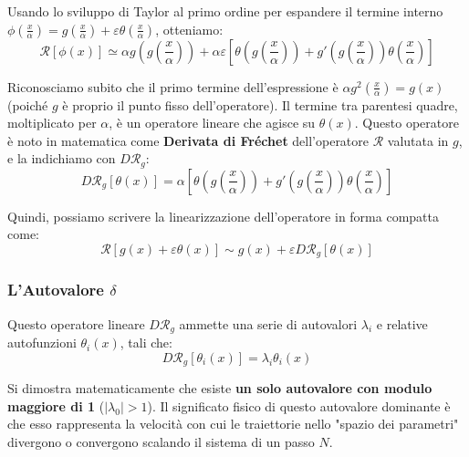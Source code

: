 \documentclass[openany]{book}
\theoremstyle{definition}
\theoremstyle{remark}
\begin{document}
Usando lo sviluppo di Taylor al primo ordine per espandere il termine interno $\phi\left(\frac{x}{\alpha}\right) = g\left(\frac{x}{\alpha}\right) + \varepsilon \theta\left(\frac{x}{\alpha}\right)$, otteniamo:
\begin{equation}
    \mathcal{R}[\phi(x)] \simeq \alpha g\left(g\left(\frac{x}{\alpha}\right)\right) + \alpha \varepsilon \left[ \theta\left(g\left(\frac{x}{\alpha}\right)\right) + g'\left(g\left(\frac{x}{\alpha}\right)\right) \theta\left(\frac{x}{\alpha}\right) \right]
\end{equation}

Riconosciamo subito che il primo termine dell'espressione è $\alpha g^2\left(\frac{x}{\alpha}\right) = g(x)$ (poiché $g$ è proprio il punto fisso dell'operatore). 
Il termine tra parentesi quadre, moltiplicato per $\alpha$, è un operatore lineare che agisce su $\theta(x)$. Questo operatore è noto in matematica come \textbf{Derivata di Fréchet} dell'operatore $\mathcal{R}$ valutata in $g$, e la indichiamo con $D\mathcal{R}_g$:
\begin{equation}
    D\mathcal{R}_g[\theta(x)] = \alpha \left[ \theta\left(g\left(\frac{x}{\alpha}\right)\right) + g'\left(g\left(\frac{x}{\alpha}\right)\right) \theta\left(\frac{x}{\alpha}\right) \right]
\end{equation}

Quindi, possiamo scrivere la linearizzazione dell'operatore in forma compatta come:
\begin{equation}
    \mathcal{R}[g(x) + \varepsilon \theta(x)] \sim g(x) + \varepsilon D\mathcal{R}_g[\theta(x)]
\end{equation}

\subsubsection*{L'Autovalore $\delta$}
Questo operatore lineare $D\mathcal{R}_g$ ammette una serie di autovalori $\lambda_i$ e relative autofunzioni $\theta_i(x)$, tali che:
\begin{equation}
    D\mathcal{R}_g[\theta_i(x)] = \lambda_i \theta_i(x)
\end{equation}

Si dimostra matematicamente che esiste \textbf{un solo autovalore con modulo maggiore di 1} ($|\lambda_0| > 1$). 
Il significato fisico di questo autovalore dominante è che esso rappresenta la velocità con cui le traiettorie nello "spazio dei parametri" divergono o convergono scalando il sistema di un passo $N$.
\end{document}
